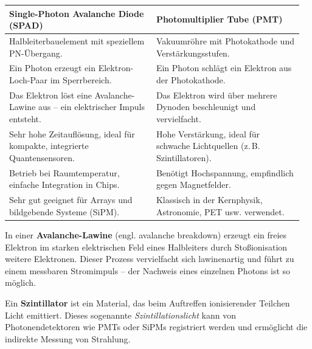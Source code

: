 \begin{tcolorbox}[hinweisbox, title=Didaktischer Vergleich: SPAD vs. PMT]
	\label{box:vergleich SPAD}
	\small
	\begin{tabular}{p{0.48\linewidth} | p{0.48\linewidth}}
		\textbf{Single-Photon Avalanche Diode (SPAD)} & \textbf{Photomultiplier Tube (PMT)} \\
		\hline
		Halbleiterbauelement mit speziellem PN-Übergang\index{PN-Übergang}. & Vakuumröhre\index{Vakuumröhre} mit Photokathode und Verstärkungsstufen. \\
		\hline
		Ein Photon erzeugt ein Elektron-Loch-Paar\index{Elektron-Loch-Paar} im Sperrbereich\index{Sperrbereich}. & Ein Photon schlägt ein Elektron aus der Photokathode. \\
		\hline
		Das Elektron löst eine Avalanche-Lawine\index{Avalanche-Lawine} aus – ein elektrischer Impuls entsteht. & Das Elektron wird über mehrere Dynoden beschleunigt und vervielfacht. \\
		\hline
		Sehr hohe Zeitauflösung\index{Zeitauflösung}, ideal für kompakte, integrierte Quantensensoren\index{Quantensensor}. & Hohe Verstärkung, ideal für schwache Lichtquellen (z.\,B. Szintillatoren\index{Szintillator}). \\
		\hline
		Betrieb bei Raumtemperatur\index{Raumtemperatur}, einfache Integration in Chips\index{Chip}. & Benötigt Hochspannung, empfindlich gegen Magnetfelder. \\
		\hline
		Sehr gut geeignet für Arrays und bildgebende Systeme (SiPM). & Klassisch in der Kernphysik\index{Kernphysik}, Astronomie, PET\index{Positronen-Emissions-Tomographie} usw. verwendet. \\
	\end{tabular}
\end{tcolorbox}
\begin{tcolorbox}[didaktikbox, title=Begriffserklärung: Avalanche-Lawine]
	\label{box:avalanche}
	\small
	In einer \textbf{Avalanche-Lawine} (engl. avalanche breakdown) erzeugt ein freies Elektron im starken elektrischen Feld eines Halbleiters durch Stoßionisation weitere Elektronen. Dieser Prozess vervielfacht sich lawinenartig und führt zu einem messbaren Stromimpuls – der Nachweis eines einzelnen Photons ist so möglich.
\end{tcolorbox}
\medskip
\begin{tcolorbox}[didaktikbox, title=Begriffserklärung: Szintillator]
	\label{box:szintillator}
	\small
	Ein \textbf{Szintillator} ist ein Material, das beim Auftreffen ionisierender Teilchen Licht emittiert. Dieses sogenannte \emph{Szintillationslicht} kann von Photonendetektoren wie PMTs oder SiPMs registriert werden und ermöglicht die indirekte Messung von Strahlung.
\end{tcolorbox}

